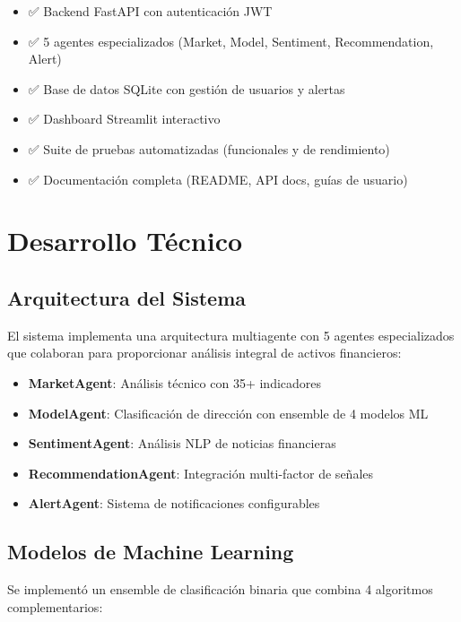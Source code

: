 \documentclass[12pt,a4paper]{article}
\begin{document}
\begin{itemize}
    \item ✅ Backend FastAPI con autenticación JWT
    \item ✅ 5 agentes especializados (Market, Model, Sentiment, Recommendation, Alert)
    \item ✅ Base de datos SQLite con gestión de usuarios y alertas
    \item ✅ Dashboard Streamlit interactivo
    \item ✅ Suite de pruebas automatizadas (funcionales y de rendimiento)
    \item ✅ Documentación completa (README, API docs, guías de usuario)
\end{itemize}

\section{Desarrollo Técnico}

\subsection{Arquitectura del Sistema}

El sistema implementa una arquitectura multiagente con 5 agentes especializados que colaboran para proporcionar análisis integral de activos financieros:

\begin{itemize}
    \item \textbf{MarketAgent}: Análisis técnico con 35+ indicadores
    \item \textbf{ModelAgent}: Clasificación de dirección con ensemble de 4 modelos ML
    \item \textbf{SentimentAgent}: Análisis NLP de noticias financieras
    \item \textbf{RecommendationAgent}: Integración multi-factor de señales
    \item \textbf{AlertAgent}: Sistema de notificaciones configurables
\end{itemize}

\subsection{Modelos de Machine Learning}

Se implementó un ensemble de clasificación binaria que combina 4 algoritmos complementarios:
\end{document}
